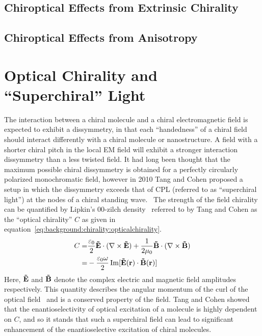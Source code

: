 \subsection{Chiroptical Effects from Extrinsic Chirality}\label{sec:background:Chirality:extrinsic}
\subsection{Chiroptical Effects from Anisotropy}\label{sec:background:Chirality:anisotropy}



\section{Optical Chirality and ``Superchiral'' Light}\label{sec:background:Chirality:opticalchirality}
The interaction between a chiral molecule and a chiral electromagnetic field is expected to exhibit a dissymmetry, in that each ``handedness'' of a chiral field should interact differently with a chiral molecule or nanostructure. A field with a shorter chiral pitch in the local EM field will exhibit a stronger interaction dissymmetry than a less twisted field. It had long been thought that the maximum possible chiral dissymmetry is obtained for a perfectly circularly polarized monochromatic field, however in 2010 Tang and Cohen proposed a setup in which the dissymmetry exceeds that of CPL (referred to as ``superchiral light'') at the nodes of a chiral standing wave.~\cite{Tang2010}
The strength of the field chirality can be quantified by Lipkin's 00-zilch density~\cite{Lipkin1964} referred to by Tang and Cohen as the ``optical chirality'' $C$ as given in equation~\ref{eq:background:chirality:opticalchirality}.
\begin{equation} \label{eq:background:chirality:opticalchirality}
    \begin{split}
        C = &\frac{\varepsilon_0 }{2}{\bf{\tilde E}} \cdot (\nabla  \times {\bf{\tilde E}}) + \frac{1}{{2\mu _0}}{\bf{\tilde B}} \cdot (\nabla  \times {\bf{\tilde B}}) \\
        = &- \frac{{{\varepsilon _0}\omega }}{2} \operatorname{Im}[ \bf{\tilde E}(\bf{r}) \cdot \bf{\tilde B}(\bf{r}) ]
    \end{split}
\end{equation}
Here, $\bf{\tilde E}$ and $\bf{\tilde B}$ denote the complex electric and magnetic field amplitudes respectively. This quantity describes the angular momentum of the curl of the optical field~\cite{Cameron2012a} and is a conserved property of the field. Tang and Cohen showed that the enantioselectivity of optical excitation of a molecule is highly dependent on $C$, and so it stands that such a superchiral field can lead to significant enhancement of the enantioselective excitation of chiral molecules.

